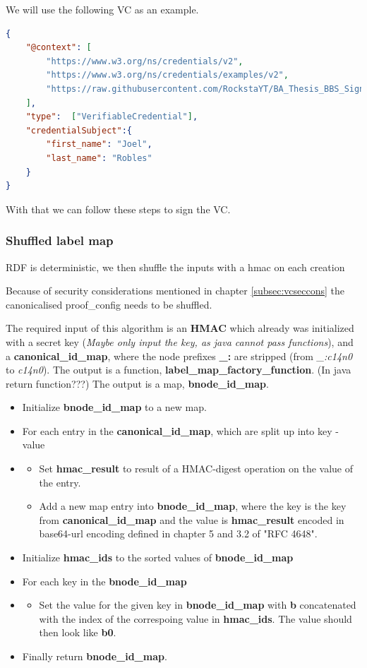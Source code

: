\documentclass[
	a4paper               %
	,bibliography=totoc   %
	,listof=totoc         %
	,monolingual
	twoside=false,
]{bfhthesis}              %
\begin{document}
We will use the following VC as an example.
\begin{lstlisting}[language=json,firstnumber=1,caption={Example VC},captionpos=b]
{
	"@context": [
		"https://www.w3.org/ns/credentials/v2",
		"https://www.w3.org/ns/credentials/examples/v2",
		"https://raw.githubusercontent.com/RockstaYT/BA_Thesis_BBS_Signatures/docs/context/example_1.jsonld"
	],
	"type":  ["VerifiableCredential"],
	"credentialSubject":{
		"first_name": "Joel",
		"last_name": "Robles"
	}
}
\end{lstlisting}

With that we can follow these steps to sign the VC.

\subsubsection{Shuffled label map}
\label{sub:shuffledlabelmap}

RDF is deterministic, we then shuffle the inputs with a hmac on each creation

Because of security considerations mentioned in chapter \ref{subsec:vcseccons} the canonicalised proof\_config needs to be shuffled.

The required input of this algorithm is an \textbf{HMAC} which already was initialized with a secret key (\textit{Maybe only input the key, as java cannot pass functions}), and a \textbf{canonical\_id\_map}, where the node prefixes \textbf{\_:} are stripped (from \textit{\_:c14n0} to \textit{c14n0}).
The output is a function, \textbf{label\_map\_factory\_function}. (In java return function???)
The output is a map, \textbf{bnode\_id\_map}.

\begin{itemize}
	\item Initialize \textbf{bnode\_id\_map} to a new map.
	\item For each entry in the \textbf{canonical\_id\_map}, which are split up into key - value
	\item \begin{itemize}
		\item Set \textbf{hmac\_result} to result of a HMAC-digest operation on the value of the entry. 
		\item Add a new map entry into \textbf{bnode\_id\_map}, where the key is the key from \textbf{canonical\_id\_map} and the value is \textbf{hmac\_result} encoded in base64-url encoding defined in chapter 5 and 3.2 of "RFC 4648"\cite{base64}.
	\end{itemize}
	\item Initialize \textbf{hmac\_ids} to the sorted values of \textbf{bnode\_id\_map}
	\item For each key in the \textbf{bnode\_id\_map}
	\item \begin{itemize}
		\item Set the value for the given key in \textbf{bnode\_id\_map} with \textbf{b} concatenated with the index of the correspoing value in \textbf{hmac\_ids}. The value should then look like \textbf{b0}.
	\end{itemize}
	\item Finally return \textbf{bnode\_id\_map}.
\end{itemize}
\end{document}
